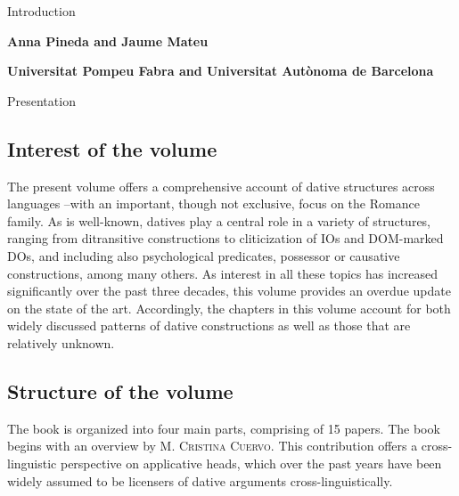 

\begin{styleTitleA}
Introduction
\end{styleTitleA}

\begin{styleBodyA}\sffamily\bfseries
Anna Pineda and Jaume Mateu
\end{styleBodyA}

\begin{styleBodyA}\sffamily\bfseries
Universitat Pompeu Fabra and Universitat Autònoma de Barcelona
\end{styleBodyA}

\begin{listWWviiiNumiileveli}
\item \begin{stylelsSectioni}
Presentation\\\end{stylelsSectioni}

\begin{listWWviiiNumiilevelii}
\item \subsection{Interest of the volume}
\end{listWWviiiNumiilevelii}
\end{listWWviiiNumiileveli}
\begin{styleBodyA}
The present volume offers a comprehensive account of dative structures across languages –with an important, though not exclusive, focus on the Romance family. As is well-known, datives play a central role in a variety of structures, ranging from ditransitive constructions to cliticization of IOs and DOM-marked DOs, and including also psychological predicates, possessor or causative constructions, among many others. As interest in all these topics has increased significantly over the past three decades, this volume provides an overdue update on the state of the art. Accordingly, the chapters in this volume account for both widely discussed patterns of dative constructions as well as those that are relatively unknown. 
\end{styleBodyA}

\begin{listWWviiiNumiileveli}
\item \begin{listWWviiiNumiilevelii}
\item \subsection{Structure of the volume}
\end{listWWviiiNumiilevelii}
\end{listWWviiiNumiileveli}
\begin{styleBodyA}
The book is organized into four main parts, comprising of 15 papers. The book begins with an overview by M. \textsc{Cristina} \textsc{Cuervo}. This contribution offers a cross-linguistic perspective on applicative heads, which over the past years have been widely assumed to be licensers of dative arguments cross-linguistically.
\end{styleBodyA}

